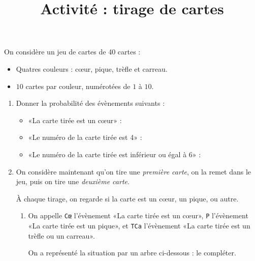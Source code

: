 \documentclass[
	classe=$2^{de}$
]{exercice}
\title{Activité : tirage de cartes}
\begin{document}
\maketitle

On considère un jeu de cartes de 40 cartes :
\begin{itemize}
	\item Quatres couleurs : cœur, pique, trèfle et carreau.
	\item $10$ cartes par couleur, numérotées de $1$ à $10$.
\end{itemize}

\begin{enumerate}
	\item Donner la probabilité des évènements suivants :
	      \begin{itemize}
		      \item «La carte tirée est un cœur» : 
		      \item «Le numéro de la carte tirée est 4» : 
		      \item «Le numéro de la carte tirée est inférieur ou égal à 6» : 
	      \end{itemize}
	\item On considère maintenant qu'on tire une \textit{première carte}, on la remet dans le jeu, puis on tire une \textit{deuxième carte}.

	      À chaque tirage, on regarde si la carte est un cœur, un pique, ou autre.
	      \begin{enumerate}
		      \item On appelle \texttt{Cœ} l'évènement «La carte tirée est un cœur», \texttt{P} l'évènement «La carte tirée est un pique», et \texttt{TCa} l'évènement «La carte tirée est un trèfle ou un carreau».

		            On a représenté la situation par un arbre ci-dessous : le compléter.


\end{enumerate}
\end{enumerate}
\end{document}
